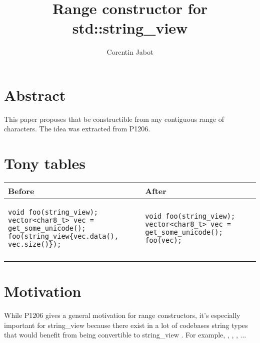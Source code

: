 \documentclass{wg21}
\title{Range constructor for std::string\_view}
\author{Corentin Jabot}{corentin.jabot@gmail.com}
\begin{document}
\maketitle

\section{Abstract}

This paper proposes that   be constructible from any contiguous range of characters.
The idea was extracted from P1206.

\section{Tony tables}
\begin{center}
\begin{tabular}{l|l}
Before & After\\ \hline

\begin{minipage}[t]{0.5\textwidth}
\begin{verbatim}
void foo(string_view);
vector<char8_t> vec = get_some_unicode();
foo(string_view{vec.data(), vec.size()});

\end{verbatim}
\end{minipage}
&
\begin{minipage}[t]{0.5\textwidth}
\begin{verbatim}
void foo(string_view);
vector<char8_t> vec = get_some_unicode();
foo(vec);
\end{verbatim}
\end{minipage}
\\\\ \hline

\end{tabular}
\end{center}

\section{Motivation}

While P1206 gives a general motivation for range constructors, it's especially important for string_view because there exist in a lot of codebases
string types that would benefit from being convertible to string_view . For example, , , ,  ...
\end{document}
